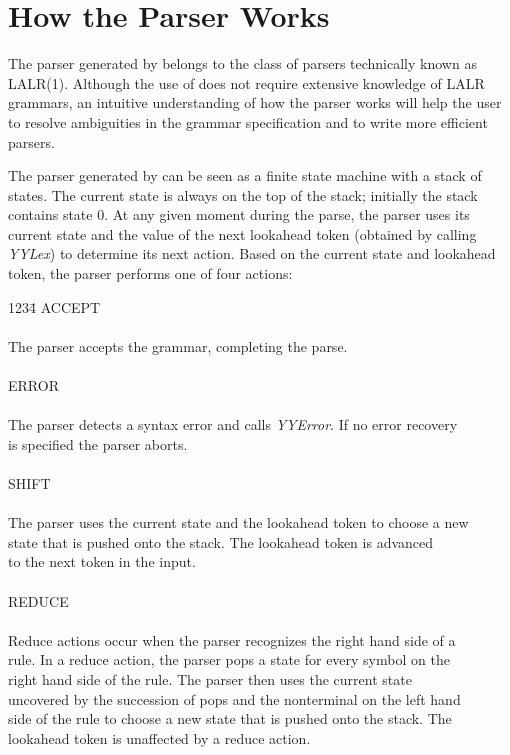 \section{How the Parser Works}
The parser generated by \ayacc belongs to the class of parsers technically
known as LALR(1).  Although the use of \ayacc does not require extensive
knowledge of LALR grammars, an intuitive understanding of
how the parser works will help the user to resolve ambiguities in the
grammar specification and to write more efficient parsers.

The parser generated by \ayacc can be seen as a finite state
machine with a stack of states.  The current state is always on the
top of the stack; initially the stack contains state 0.  At any given
moment during the parse, the parser uses its current state  and the
value of the next lookahead token (obtained by calling
{\it YYLex})
to determine its next action.  Based on the current state and
lookahead token, the parser performs one of four actions:

\begin{tabbing}
1234\=\kill
ACCEPT\\
\\
\>The parser accepts the grammar, completing the parse.\\
\\
ERROR\\
\\
\>The parser detects a syntax error and calls {\it YYError}. If no error recovery\\
\>is specified the parser aborts.\\
\\
SHIFT\\
\\
\>The parser uses the current state and the lookahead token to choose a new\\
\>state that is pushed onto the stack.  The lookahead token is advanced\\
\>to the next token in the input.\\
\\
REDUCE\\
\\
\>Reduce actions occur when the parser recognizes the right hand side of a\\
\>rule.  In a reduce action, the parser pops a state for every symbol on the\\
\>right hand side of the rule.  The parser then uses the current state\\
\>uncovered by the succession of pops and the nonterminal on the left hand\\
\>side of the rule to choose a new state that is pushed onto the stack.  The\\
\>lookahead token is unaffected by a reduce action.\\
\end{tabbing}
\newpage

